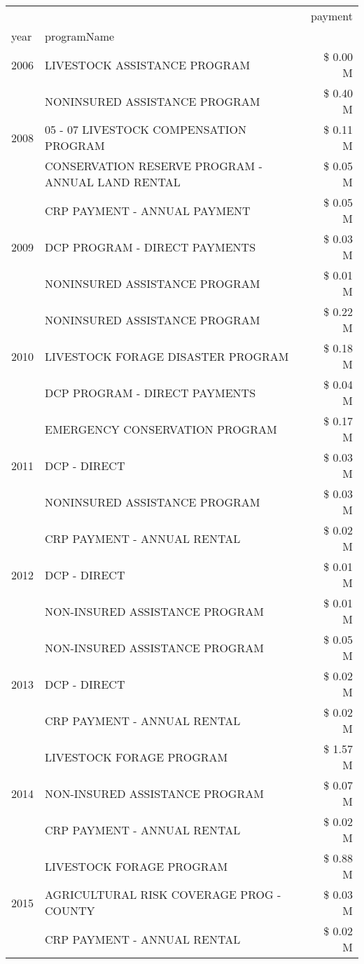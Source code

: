 \begin{tabular}{llr}
\toprule
 &  & payment \\
year & programName &  \\
\midrule
2006 & LIVESTOCK ASSISTANCE PROGRAM & \$ 0.00 M \\
\cline{1-3}
\multirow[t]{3}{*}{2008} & NONINSURED ASSISTANCE PROGRAM & \$ 0.40 M \\
 & 05 - 07 LIVESTOCK COMPENSATION PROGRAM & \$ 0.11 M \\
 & CONSERVATION RESERVE PROGRAM - ANNUAL LAND RENTAL & \$ 0.05 M \\
\cline{1-3}
\multirow[t]{3}{*}{2009} & CRP PAYMENT - ANNUAL PAYMENT & \$ 0.05 M \\
 & DCP PROGRAM - DIRECT PAYMENTS & \$ 0.03 M \\
 & NONINSURED ASSISTANCE PROGRAM & \$ 0.01 M \\
\cline{1-3}
\multirow[t]{3}{*}{2010} & NONINSURED ASSISTANCE PROGRAM & \$ 0.22 M \\
 & LIVESTOCK FORAGE DISASTER  PROGRAM & \$ 0.18 M \\
 & DCP PROGRAM - DIRECT PAYMENTS & \$ 0.04 M \\
\cline{1-3}
\multirow[t]{3}{*}{2011} & EMERGENCY CONSERVATION PROGRAM & \$ 0.17 M \\
 & DCP - DIRECT & \$ 0.03 M \\
 & NONINSURED ASSISTANCE PROGRAM & \$ 0.03 M \\
\cline{1-3}
\multirow[t]{3}{*}{2012} & CRP PAYMENT - ANNUAL RENTAL & \$ 0.02 M \\
 & DCP - DIRECT & \$ 0.01 M \\
 & NON-INSURED ASSISTANCE PROGRAM & \$ 0.01 M \\
\cline{1-3}
\multirow[t]{3}{*}{2013} & NON-INSURED ASSISTANCE PROGRAM & \$ 0.05 M \\
 & DCP - DIRECT & \$ 0.02 M \\
 & CRP PAYMENT - ANNUAL RENTAL & \$ 0.02 M \\
\cline{1-3}
\multirow[t]{3}{*}{2014} & LIVESTOCK FORAGE PROGRAM & \$ 1.57 M \\
 & NON-INSURED ASSISTANCE PROGRAM & \$ 0.07 M \\
 & CRP PAYMENT - ANNUAL RENTAL & \$ 0.02 M \\
\cline{1-3}
\multirow[t]{3}{*}{2015} & LIVESTOCK FORAGE PROGRAM & \$ 0.88 M \\
 & AGRICULTURAL RISK COVERAGE PROG - COUNTY & \$ 0.03 M \\
 & CRP PAYMENT - ANNUAL RENTAL & \$ 0.02 M \\

\end{tabular}
